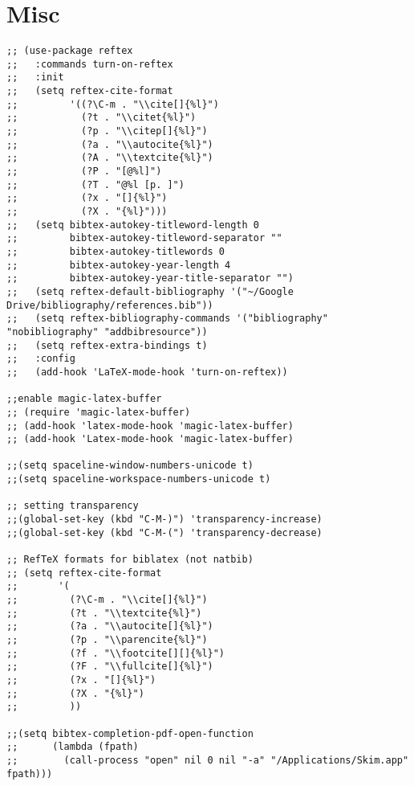 \documentclass[11pt]{article}
\begin{document}
\section{Misc}
\label{sec:orgheadline48}
\begin{verbatim}
;; (use-package reftex
;;   :commands turn-on-reftex
;;   :init
;;   (setq reftex-cite-format
;;         '((?\C-m . "\\cite[]{%l}")
;;           (?t . "\\citet{%l}")
;;           (?p . "\\citep[]{%l}")
;;           (?a . "\\autocite{%l}")
;;           (?A . "\\textcite{%l}")
;;           (?P . "[@%l]")
;;           (?T . "@%l [p. ]")
;;           (?x . "[]{%l}")
;;           (?X . "{%l}")))
;;   (setq bibtex-autokey-titleword-length 0
;;         bibtex-autokey-titleword-separator ""
;;         bibtex-autokey-titlewords 0
;;         bibtex-autokey-year-length 4
;;         bibtex-autokey-year-title-separator "")
;;   (setq reftex-default-bibliography '("~/Google Drive/bibliography/references.bib"))
;;   (setq reftex-bibliography-commands '("bibliography" "nobibliography" "addbibresource"))
;;   (setq reftex-extra-bindings t)
;;   :config
;;   (add-hook 'LaTeX-mode-hook 'turn-on-reftex))

;;enable magic-latex-buffer
;; (require 'magic-latex-buffer)
;; (add-hook 'latex-mode-hook 'magic-latex-buffer)
;; (add-hook 'Latex-mode-hook 'magic-latex-buffer)

;;(setq spaceline-window-numbers-unicode t)
;;(setq spaceline-workspace-numbers-unicode t)

;; setting transparency
;;(global-set-key (kbd "C-M-)") 'transparency-increase)
;;(global-set-key (kbd "C-M-(") 'transparency-decrease)

;; RefTeX formats for biblatex (not natbib)
;; (setq reftex-cite-format
;;       '(
;;         (?\C-m . "\\cite[]{%l}")
;;         (?t . "\\textcite{%l}")
;;         (?a . "\\autocite[]{%l}")
;;         (?p . "\\parencite{%l}")
;;         (?f . "\\footcite[][]{%l}")
;;         (?F . "\\fullcite[]{%l}")
;;         (?x . "[]{%l}")
;;         (?X . "{%l}")
;;         ))

;;(setq bibtex-completion-pdf-open-function
;;      (lambda (fpath)
;;        (call-process "open" nil 0 nil "-a" "/Applications/Skim.app" fpath)))
\end{verbatim}
\end{document}
